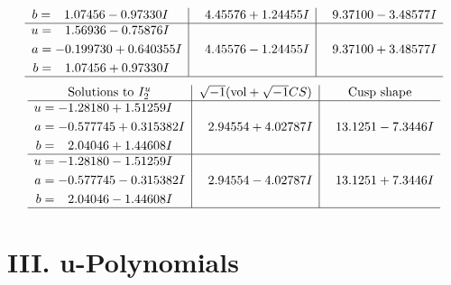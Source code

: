 \documentclass[1p]{elsarticle_modified}
\theoremstyle{definition}
\newcommand{\I}{\sqrt{-1}}
\begin{document}
$$\begin{array}{c|c|c}
\begin{aligned}
b &= \phantom{-}1.07456 - 0.97330 I\end{aligned}
 & \phantom{-}4.45576 + 1.24455 I & \phantom{-}9.37100 - 3.48577 I \\ \hline\begin{aligned}
u &= \phantom{-}1.56936 - 0.75876 I \\
a &= -0.199730 + 0.640355 I \\
b &= \phantom{-}1.07456 + 0.97330 I\end{aligned}
 & \phantom{-}4.45576 - 1.24455 I & \phantom{-}9.37100 + 3.48577 I\\
 \hline 
 \end{array}$$\newpage$$\begin{array}{c|c|c}  
\text{Solutions to }I^u_{2}& \I (\text{vol} + \sqrt{-1}CS) & \text{Cusp shape}\\
 \hline 
\begin{aligned}
u &= -1.28180 + 1.51259 I \\
a &= -0.577745 + 0.315382 I \\
b &= \phantom{-}2.04046 + 1.44608 I\end{aligned}
 & \phantom{-}2.94554 + 4.02787 I & \phantom{-}13.1251 - 7.3446 I \\ \hline\begin{aligned}
u &= -1.28180 - 1.51259 I \\
a &= -0.577745 - 0.315382 I \\
b &= \phantom{-}2.04046 - 1.44608 I\end{aligned}
 & \phantom{-}2.94554 - 4.02787 I & \phantom{-}13.1251 + 7.3446 I\\
 \hline 
 \end{array}$$\newpage
\newpage\renewcommand{\arraystretch}{1}
\centering \section*{ III. u-Polynomials}
\end{document}
